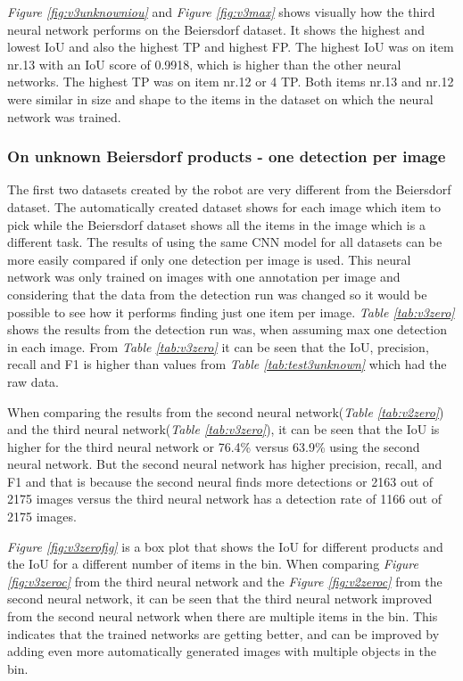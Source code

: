 \textit{Figure \ref{fig:v3unknowniou}} and \textit{Figure \ref{fig:v3max}} shows visually how the third neural network performs on the Beiersdorf dataset. It shows the highest and lowest IoU and also the highest TP and highest FP. The highest IoU was on item nr.13 with an IoU score of 0.9918, which is higher than the other neural networks. The highest TP was on item nr.12 or 4 TP. Both items nr.13 and nr.12 were similar in size and shape to the items in the dataset on which the neural network was trained.

\subsubsection{On unknown Beiersdorf products - one detection per image}
The first two datasets created by the robot are very different from the Beiersdorf dataset. The automatically created dataset shows for each image which item to pick while the Beiersdorf dataset shows all the items in the image which is a different task. The results of using the same CNN model for all datasets can be more easily compared if only one detection per image is used. This neural network was only trained on images with one annotation per image and considering that the data from the detection run was changed so it would be possible to see how it performs finding just one item per image. \textit{Table \ref{tab:v3zero}} shows the results from the detection run was, when assuming max one detection in each image. From \textit{Table \ref{tab:v3zero}} it can be seen that the IoU, precision, recall and F1 is higher than values from \textit{Table \ref{tab:test3unknown}} which had the raw data.

When comparing the results from the second neural network(\textit{Table \ref{tab:v2zero}}) and the third neural network(\textit{Table \ref{tab:v3zero}}), it can be seen that the IoU is higher for the third neural network or 76.4\% versus 63.9\% using the second neural network. But the second neural network has higher precision, recall, and F1 and that is because the second neural finds more detections or 2163 out of 2175 images versus the third neural network has a detection rate of 1166 out of 2175 images. 

\textit{Figure \ref{fig:v3zerofig}} is a box plot that shows the IoU for different products and the IoU for a different number of items in the bin. When comparing \textit{Figure \ref{fig:v3zeroc}} from the third neural network and the \textit{Figure \ref{fig:v2zeroc}} from the second neural network, it can be seen that the third neural network improved from the second neural network when there are multiple items in the bin. This indicates that the trained networks are getting better, and can be improved by adding even more automatically generated images with multiple objects in the bin.

